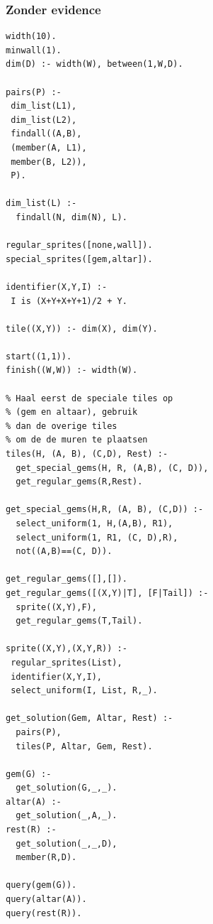 \documentclass{article}
\begin{document}
\subsubsection*{Zonder evidence}
\begin{lstlisting}[language=Prolog-pretty]
width(10).
minwall(1).
dim(D) :- width(W), between(1,W,D).

pairs(P) :-
 dim_list(L1),
 dim_list(L2),
 findall((A,B),
 (member(A, L1),
 member(B, L2)),
 P).

dim_list(L) :-
  findall(N, dim(N), L).

regular_sprites([none,wall]).
special_sprites([gem,altar]).

identifier(X,Y,I) :- 
 I is (X+Y+X+Y+1)/2 + Y.

tile((X,Y)) :- dim(X), dim(Y).

start((1,1)).
finish((W,W)) :- width(W).

% Haal eerst de speciale tiles op
% (gem en altaar), gebruik
% dan de overige tiles
% om de de muren te plaatsen
tiles(H, (A, B), (C,D), Rest) :-
  get_special_gems(H, R, (A,B), (C, D)),
  get_regular_gems(R,Rest).

get_special_gems(H,R, (A, B), (C,D)) :-
  select_uniform(1, H,(A,B), R1),
  select_uniform(1, R1, (C, D),R),
  not((A,B)==(C, D)).

get_regular_gems([],[]).
get_regular_gems([(X,Y)|T], [F|Tail]) :-
  sprite((X,Y),F),
  get_regular_gems(T,Tail).

sprite((X,Y),(X,Y,R)) :-
 regular_sprites(List),
 identifier(X,Y,I),
 select_uniform(I, List, R,_).

get_solution(Gem, Altar, Rest) :-
  pairs(P),
  tiles(P, Altar, Gem, Rest).

gem(G) :-
  get_solution(G,_,_).
altar(A) :-
  get_solution(_,A,_).
rest(R) :-
  get_solution(_,_,D),
  member(R,D).

query(gem(G)).
query(altar(A)).
query(rest(R)).
\end{lstlisting}
\end{document}
